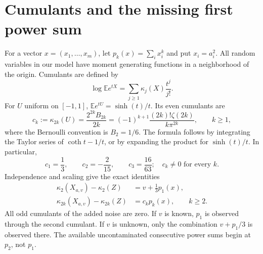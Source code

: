 \documentclass[11pt,a4paper]{article}
\numberwithin{equation}{section}
\theoremstyle{definition}
\theoremstyle{remark}
\newcommand{\E}{\mathbb E}
\newcommand{\kap}{\kappa}
\begin{document}
\section{Cumulants and the missing first power sum}
\label{sec:cumulants}

For a vector $x=(x_1,\ldots,x_m)$, let $p_k(x)=\sum_i x_i^k$ and put
$x_i=a_i^2$. All random variables in our model have moment generating
functions in a neighborhood of the origin. Cumulants are defined by
\begin{equation}
 \log\E e^{tX}=\sum_{j\ge1}\kap_j(X)\frac{t^j}{j!}.
\end{equation}
For $U$ uniform on $[-1,1]$, $\E e^{tU}=\sinh(t)/t$. Its even cumulants are
\begin{equation}
 c_k:=\kap_{2k}(U)=\frac{2^{2k}B_{2k}}{2k}
 =(-1)^{k+1}\frac{(2k)!\zeta(2k)}{k\pi^{2k}},
 \qquad k\ge1,
 \label{eq:ck}
\end{equation}
where the Bernoulli convention is $B_2=1/6$. The formula follows by integrating
the Taylor series of $\coth t-1/t$, or by expanding the product for
$\sinh(t)/t$. In particular,
\begin{equation}
 c_1=\frac13,\qquad c_2=-\frac{2}{15},\qquad c_3=\frac{16}{63};
 \quad c_k\ne0\text{ for every }k.
\end{equation}
Independence and scaling give the exact identities
\begin{align}
 \kap_2(X_{a,v})-\kap_2(Z)&=v+\frac13p_1(x),
 \label{eq:varianceidentity}\\
 \kap_{2k}(X_{a,v})-\kap_{2k}(Z)&=c_kp_k(x),\qquad k\ge2.
 \label{eq:cumulantidentity}
\end{align}
All odd cumulants of the added noise are zero. If $v$ is known, $p_1$ is
observed through the second cumulant. If $v$ is unknown, only the combination
$v+p_1/3$ is observed there. The available uncontaminated consecutive power
sums begin at $p_2$, not $p_1$.
\end{document}
